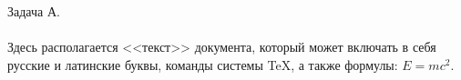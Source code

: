 \documentclass[a4paper,20pt,landscape]{extreport}
\begin{document}


{\large Задача А.}
\\
\\
Здесь располагается <<текст>> документа, который может включать в себя русские и латинские буквы, команды системы \TeX, а также формулы: $E = mc^2$.
\end{document}
